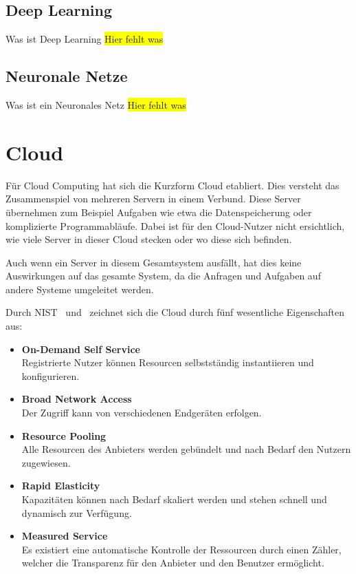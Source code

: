 \subsection{Deep Learning}
Was ist Deep Learning
\colorbox{yellow}{Hier fehlt was}

\subsection{Neuronale Netze}
Was ist ein Neuronales Netz
\colorbox{yellow}{Hier fehlt was}

\section{Cloud}
Für Cloud Computing hat sich die Kurzform Cloud etabliert. Dies versteht das Zusammenspiel von mehreren Servern in einem
Verbund. Diese Server übernehmen zum Beispiel Aufgaben wie etwa die Datenspeicherung oder komplizierte Programmabläufe.
Dabei ist für den Cloud-Nutzer nicht ersichtlich, wie viele Server in dieser Cloud stecken oder wo diese sich befinden.

Auch wenn ein Server in diesem Gesamtsystem ausfällt, hat dies keine Auswirkungen auf das gesamte System, da die Anfragen
und Aufgaben auf andere Systeme umgeleitet werden.

Durch NIST~\cite{online_grundlagen_cloud_nist} und~\cite{online_grundlagen_cloud_computing} zeichnet sich die Cloud durch
fünf wesentliche Eigenschaften aus:

\begin{itemize}
    \item \textbf{On-Demand Self Service} \\
    Registrierte Nutzer können Resourcen selbstständig instantiieren und konfigurieren.
    \item \textbf{Broad Network Access} \\
    Der Zugriff kann von verschiedenen Endgeräten erfolgen.
    \item \textbf{Resource Pooling} \\
    Alle Resourcen des Anbieters werden gebündelt und nach Bedarf den Nutzern zugewiesen.
    \item \textbf{Rapid Elasticity} \\
    Kapazitäten können nach Bedarf skaliert werden und stehen schnell und dynamisch zur Verfügung.
    \item \textbf{Measured Service} \\
    Es existiert eine automatische Kontrolle der Ressourcen durch einen Zähler, welcher die Transparenz für den
    Anbieter und den Benutzer ermöglicht.
\end{itemize}

